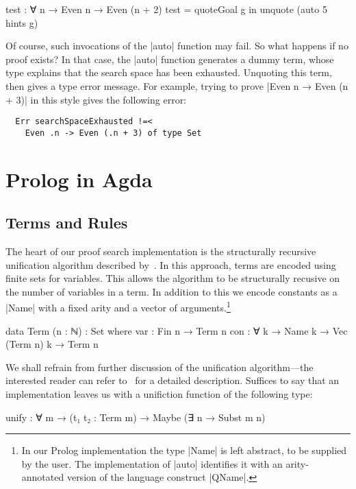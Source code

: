 \documentclass[preprint]{sigplanconf}
\begin{document}
\begin{code}
  test : ∀ {n} → Even n → Even (n + 2)
  test = quoteGoal g in unquote (auto 5 hints g)
\end{code}

Of course, such invocations of the |auto| function may fail. So what happens
if no proof exists? In that case, the |auto| function generates a dummy term,
whose type explains that the search space has been exhausted. Unquoting this
term, then gives a type error message. For example, trying to prove |Even n →
Even (n + 3)| in this style gives the following error:

\begin{verbatim}
  Err searchSpaceExhausted !=<
    Even .n -> Even (.n + 3) of type Set
\end{verbatim}



\section{Prolog in Agda}
\label{sec:prolog}

\subsection{Terms and Rules}

The heart of our proof search implementation is the structurally recursive
unification algorithm described by~\citet{mcbride}. In this approach, terms
are encoded using finite sets for variables. This allows the algorithm to
be structurally recusive on the number of variables in a term. In addition
to this we encode constants as a |Name| with a fixed arity and a vector of
arguments.\footnote{
  In our Prolog implementation the type |Name| is left abstract, to be
  supplied by the user. The implementation of |auto| identifies it with
  an arity-annotated version of the language construct |QName|.
}

\begin{code}
  data Term (n : ℕ) : Set where
    var  : Fin n → Term n
    con  : ∀ {k} → Name k → Vec (Term n) k → Term n
\end{code}

We shall refrain from further discussion of the unification algorithm---the
interested reader can refer to~\cite{mcbride} for a detailed description.
Suffices to say that an implementation leaves us with a unifiction function
of the following type:

\begin{spec}
  unify : ∀ {m} → (t₁ t₂ : Term m) → Maybe (∃ n → Subst m n)
\end{spec}
\end{document}
